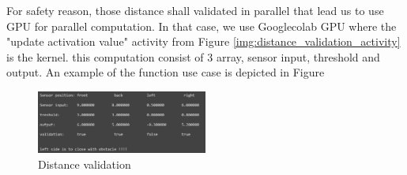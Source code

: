 For safety reason, those distance shall validated in parallel that lead us to use GPU for parallel computation. In that case, we use Googlecolab GPU where the "update activation value" activity from Figure \ref{img:distance_validation_activity} is the kernel.
this computation consist of 3 array, sensor input, threshold and output. An example of the function use case is depicted in Figure

\begin{figure}[ht]
    \centering
    \includegraphics[width=0.5\textwidth]{images/distance_validation.png}
    \caption{Distance validation}
    \label{img:distance_validation}
\end{figure}












